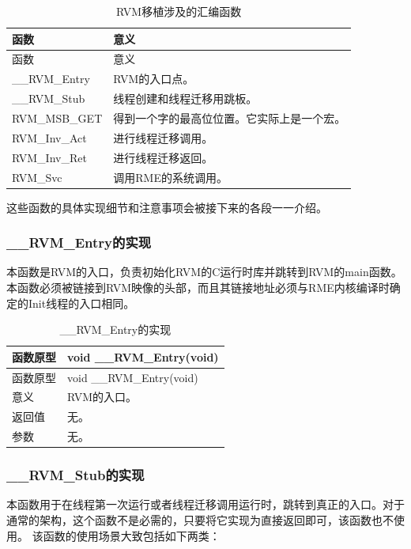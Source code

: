 \begin{xltabular}{\textwidth}{@{}>{\hsize\raggedright\arraybackslash}X>{\hsize\raggedright\arraybackslash}X@{}}
\caption{RVM移植涉及的汇编函数}\label{tab:8-6}\\
\toprule
函数 & 意义\tabularnewline
\endfirsthead
\toprule
函数 & 意义\tabularnewline
\midrule
\endhead
\bottomrule
\endlastfoot
\_\allowbreak{}\_\allowbreak{}RVM\_\allowbreak{}Entry & RVM的入口点。\tabularnewline
\_\allowbreak{}\_\allowbreak{}RVM\_\allowbreak{}Stub & 线程创建和线程迁移用跳板。\tabularnewline
RVM\_\allowbreak{}MSB\_\allowbreak{}GET &
得到一个字的最高位位置。它实际上是一个宏。\tabularnewline
RVM\_\allowbreak{}Inv\_\allowbreak{}Act & 进行线程迁移调用。\tabularnewline
RVM\_\allowbreak{}Inv\_\allowbreak{}Ret & 进行线程迁移返回。\tabularnewline
RVM\_\allowbreak{}Svc & 调用RME的系统调用。\tabularnewline
\end{xltabular}

这些函数的具体实现细节和注意事项会被接下来的各段一一介绍。

\subsubsection{\_\_RVM\_Entry的实现}\label{subsubsec:8-2-6-1}

本函数是RVM的入口，负责初始化RVM的C运行时库并跳转到RVM的main函数。本函数必须被链接到RVM映像的头部，而且其链接地址必须与RME内核编译时确定的Init线程的入口相同。

\begin{xltabular}{\textwidth}{@{}>{\hsize\raggedright\arraybackslash}X>{\hsize\raggedright\arraybackslash}X@{}}
\caption{\_\allowbreak{}\_\allowbreak{}RVM\_\allowbreak{}Entry的实现}\label{tab:8-7}\\
\toprule
函数原型 & void \_\allowbreak{}\_\allowbreak{}RVM\_\allowbreak{}Entry(void)\tabularnewline
\endfirsthead
\toprule
函数原型 & void \_\allowbreak{}\_\allowbreak{}RVM\_\allowbreak{}Entry(void)\tabularnewline
\midrule
\endhead
\bottomrule
\endlastfoot
意义 & RVM的入口。\tabularnewline
返回值 & 无。\tabularnewline
参数 & 无。\tabularnewline
\end{xltabular}

\subsubsection{\_\_RVM\_Stub的实现}\label{subsubsec:8-2-6-2}

本函数用于在线程第一次运行或者线程迁移调用运行时，跳转到真正的入口。对于通常的架构，这个函数不是必需的，只要将它实现为直接返回即可，该函数也不使用。
该函数的使用场景大致包括如下两类：

